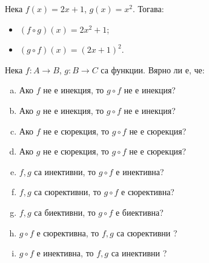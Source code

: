 \begin{example}
  Нека $f(x) = 2x+1$, $g(x) = x^2$. Тогава:
  \begin{itemize}
  \item 
    $(f\circ g)(x) = 2x^2 + 1$;
  \item
    $(g\circ f)(x) = (2x+1)^2$.
  \end{itemize}
\end{example}


  





  
  






\begin{problem}
  Нека $f: A\to B$, $g: B\to C$ са функции.
  Вярно ли е, че:
  \begin{enumerate}[a)]
  \item 
    Ако $f$ не е инекция, то $g\circ f$ не е инекция?
  \item
    Ако $g$ не е инекция, то $g\circ f$ не е инекция?
  \item 
    Ако $f$ не е сюрекция, то $g\circ f$ не е сюрекция?
  \item
    Ако $g$ не е сюрекция, то $g\circ f$ не е сюрекция?
  \item
    $f,g$ са инективни, то $g\circ f$ е инективна?
  \item
    $f,g$ са сюрективни, то $g\circ f$ е сюрективна?
  \item
    $f,g$ са биективни, то $g\circ f$ е биективна?
  \item
    $g\circ f$ е сюрективна,  то $f,g$ са сюрективни ?
  \item
    $g\circ f$ е инективна, то $f,g$ са инективни ?
  \end{enumerate}
\end{problem}

